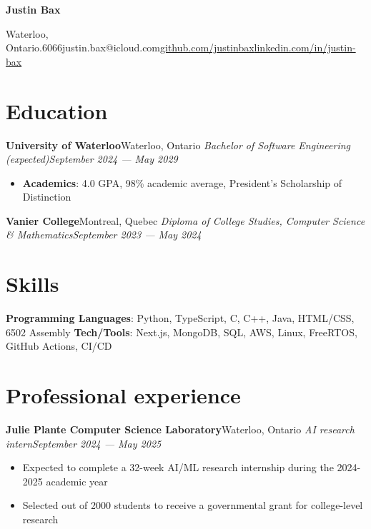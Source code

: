 \documentclass{article}
\newcommand{\cdelim}{\;\textbar\;}
\newcommand{\newrole}[4]{
    {\normalfont\textbf{#1}\hfill#3}
    \newline
    \textit{#2}\hfill\textit{#4}
}
\newenvironment{bulletpoints}{\begin{itemize}\setlength\itemsep{-0.2em}}{\end{itemize}}
\begin{document}
\begin{center}
    {\Huge\bfseries Justin Bax}\\\vspace*{2pt}

    Waterloo, Ontario\cdelim 438.763.6066\cdelim justin.bax@icloud.com\cdelim\href{https://github.com/justinbax}{github.com/justinbax}\cdelim\href{https://linkedin.com/in/justin-bax}{linkedin.com/in/justin-bax}\\
\end{center}

\section*{Education}

\newrole{University of Waterloo}{Bachelor of Software Engineering (expected)}{Waterloo, Ontario}{September 2024 --- May 2029}
\begin{bulletpoints}
    \vspace*{-2pt}
    \item {\bfseries Academics}: 4.0 GPA, 98\% academic average, President's Scholarship of Distinction
\end{bulletpoints}

\vspace*{4pt}

\newrole{Vanier College}{Diploma of College Studies, Computer Science \& Mathematics}{Montreal, Quebec}{September 2023 --- May 2024}

\section*{Skills}

{\bfseries Programming Languages}: Python, TypeScript, C, C++, Java, HTML/CSS, 6502 Assembly
\newline
{\bfseries Tech/Tools}: Next.js, MongoDB, SQL, AWS, Linux, FreeRTOS, GitHub Actions, CI/CD


\section*{Professional experience}

\newrole{Julie Plante Computer Science Laboratory}{AI research intern}{Waterloo, Ontario}{September 2024 --- May 2025}
\begin{bulletpoints}
    \item Expected to complete a 32-week AI/ML research internship during the 2024-2025 academic year
    \item Selected out of 2000 students to receive a governmental grant for college-level research
\end{bulletpoints}
\end{document}
